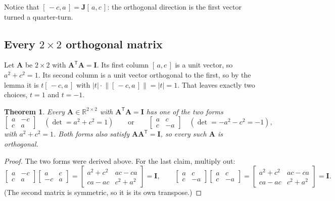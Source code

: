 \documentclass[11pt]{article}
\theoremstyle{plain}
\newtheorem{thm}{Theorem}[section]
\theoremstyle{definition}
\theoremstyle{remark}
\newcommand{\R}{\mathbb{R}}
\newcommand{\mt}[1]{\mathbf{#1}}
\newcommand{\norm}[1]{\lVert #1\rVert}
\newcommand{\T}{^{\mathsf{T}}}
\begin{document}
\noindent Notice that $[\,-c,a\,]=\mt{J}[\,a,c\,]$: the orthogonal direction is
the first vector turned a quarter-turn.

\subsection{Every \texorpdfstring{$2\times2$}{2x2} orthogonal matrix}
Let $\mt{A}$ be $2\times2$ with $\mt{A}\T\mt{A}=\mt{I}$. Its first column
$[\,a,c\,]$ is a unit vector, so $a^{2}+c^{2}=1$. Its second column is a unit
vector orthogonal to the first, so by the lemma it is $t[\,-c,a\,]$ with
$|t|\cdot\norm{[\,-c,a\,]}=|t|=1$. That leaves exactly two choices, $t=1$ and
$t=-1$.

\begin{thm}
\label{thm:orth2}
Every $\mt{A}\in\R^{2\times2}$ with $\mt{A}\T\mt{A}=\mt{I}$ has one of the two
forms
\[
  \begin{bmatrix}a&-c\\c&a\end{bmatrix}
  \quad(\det=a^{2}+c^{2}=1)
  \qquad\text{or}\qquad
  \begin{bmatrix}a&c\\c&-a\end{bmatrix}
  \quad(\det=-a^{2}-c^{2}=-1),
\]
with $a^{2}+c^{2}=1$. Both forms also satisfy $\mt{A}\mt{A}\T=\mt{I}$, so every
such $\mt{A}$ is orthogonal.
\end{thm}

\begin{proof}
The two forms were derived above. For the last claim, multiply out:
\[
  \begin{bmatrix}a&-c\\c&a\end{bmatrix}\begin{bmatrix}a&c\\-c&a\end{bmatrix}
  =\begin{bmatrix}a^{2}+c^{2}&ac-ca\\ca-ac&c^{2}+a^{2}\end{bmatrix}=\mt{I},
  \qquad
  \begin{bmatrix}a&c\\c&-a\end{bmatrix}\begin{bmatrix}a&c\\c&-a\end{bmatrix}
  =\begin{bmatrix}a^{2}+c^{2}&ac-ca\\ca-ac&c^{2}+a^{2}\end{bmatrix}=\mt{I}.
\]
(The second matrix is symmetric, so it is its own transpose.)
\end{proof}
\end{document}
